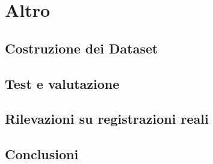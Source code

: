 \documentclass[a4paper,11pt,oneside]{book}
\begin{document}
	\frontespizio
	\tableofcontents
	\newpage

	\linenumbers

	\onehalfspacing


	

	

	

	

	\chapter{Altro}
	\section{Costruzione dei Dataset}
	\label{sec:Costruzione dei Dataset}

	\section{Test e valutazione}
	\label{sec:Test e valutazione}

	\section{Rilevazioni su registrazioni reali}
	\label{sec:Rilevazioni su registrazioni reali}

	\section{Conclusioni}
	\label{sec:Conclusioni}

	\nocite{*}
	
	{}
\end{document}
